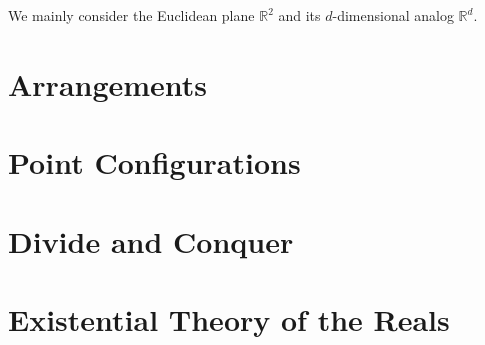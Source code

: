 We mainly consider the Euclidean plane \(\mathbb{R}^2\) and its
\(d\)-dimensional analog \(\mathbb{R}^d\).

\chapter{Arrangements}


\chapter{Point Configurations}


\chapter{Divide and Conquer}


\chapter{Existential Theory of the Reals}




